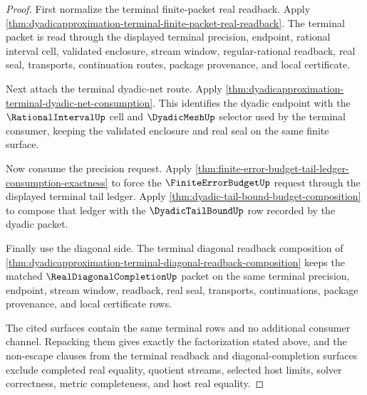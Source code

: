 \begin{proof}
First normalize the terminal finite-packet real readback. Apply \autoref{thm:dyadicapproximation-terminal-finite-packet-real-readback}. The terminal packet is read through the displayed terminal precision, endpoint, rational interval cell, validated enclosure, stream window, regular-rational readback, real seal, transports, continuation routes, package provenance, and local certificate.

Next attach the terminal dyadic-net route. Apply \autoref{thm:dyadicapproximation-terminal-dyadic-net-consumption}. This identifies the dyadic endpoint with the $\RationalIntervalUp$ cell and $\DyadicMeshUp$ selector used by the terminal consumer, keeping the validated enclosure and real seal on the same finite surface.

Now consume the precision request. Apply \autoref{thm:finite-error-budget-tail-ledger-consumption-exactness} to force the $\FiniteErrorBudgetUp$ request through the displayed terminal tail ledger. Apply \autoref{thm:dyadic-tail-bound-budget-composition} to compose that ledger with the $\DyadicTailBoundUp$ row recorded by the dyadic packet.

Finally use the diagonal side. The terminal diagonal readback composition of \autoref{thm:dyadicapproximation-terminal-diagonal-readback-composition} keeps the matched $\RealDiagonalCompletionUp$ packet on the same terminal precision, endpoint, stream window, readback, real seal, transports, continuations, package provenance, and local certificate rows.

The cited surfaces contain the same terminal rows and no additional consumer channel. Repacking them gives exactly the factorization stated above, and the non-escape clauses from the terminal readback and diagonal-completion surfaces exclude completed real equality, quotient streams, selected host limits, solver correctness, metric completeness, and host real equality.
\end{proof}
